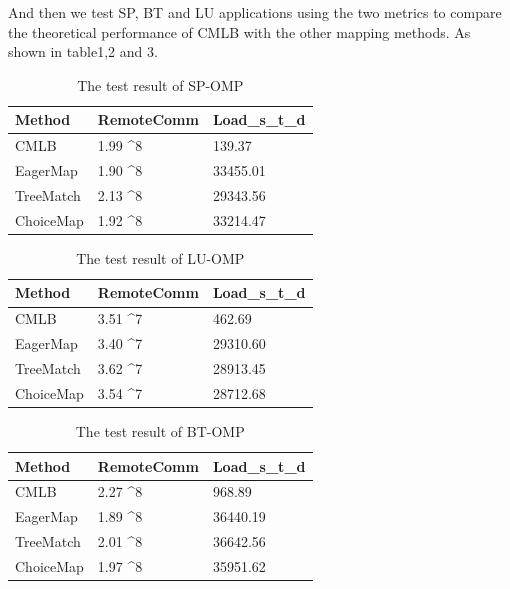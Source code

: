 \documentclass[a4paper,fleqn]{cas-sc}
\begin{document}
And then we test SP, BT and LU applications using the two metrics to compare the theoretical performance of CMLB with the other mapping methods. As shown in table1,2 and 3.

\begin{table}[width=.71\linewidth,cols=6,pos=h]
	\caption{The test result of SP-OMP}\label{tbl1}
	\begin{tabular*}{\tblwidth}{@{} LLL@{} }
		\toprule
		Method & RemoteComm & Load_s_t_d \\
		\midrule
		CMLB & 1.99 ^8 &139.37 \\
		EagerMap & 1.90 ^8 & 33455.01 \\
		TreeMatch & 2.13 ^8 & 29343.56 \\
		ChoiceMap & 1.92 ^8 & 33214.47 \\
		\bottomrule
	\end{tabular*}
\end{table}

\begin{table}[width=.71\linewidth,cols=6,pos=h]
	\caption{The test result of LU-OMP}\label{tbl1}
	\begin{tabular*}{\tblwidth}{@{} LLL@{} }
		\toprule
		Method & RemoteComm & Load_s_t_d \\
		\midrule
		CMLB & 3.51 ^7 &462.69 \\
		EagerMap & 3.40 ^7 & 29310.60 \\
		TreeMatch & 3.62 ^7 & 28913.45 \\
		ChoiceMap & 3.54 ^7 & 28712.68 \\
		\bottomrule
	\end{tabular*}
\end{table}

\begin{table}[width=.71\linewidth,cols=6,pos=h]
	\caption{The test result of BT-OMP}\label{tbl1}
	\begin{tabular*}{\tblwidth}{@{} LLL@{} }
		\toprule
		Method & RemoteComm & Load_s_t_d \\
		\midrule
		CMLB & 2.27 ^8 &968.89 \\
		EagerMap & 1.89 ^8 & 36440.19 \\
		TreeMatch & 2.01 ^8 & 36642.56 \\
		ChoiceMap & 1.97 ^8 & 35951.62 \\
		\bottomrule
	\end{tabular*}
\end{table}
\end{document}

